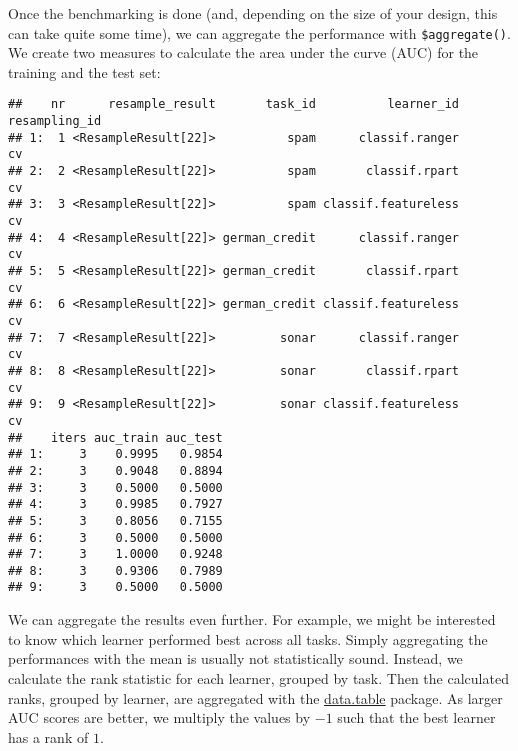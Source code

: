 \documentclass[
]{scrbook}
\newenvironment{Shaded}{\begin{snugshade}}{\end{snugshade}}
\newcommand{\AttributeTok}[1]{\textcolor[rgb]{0.77,0.63,0.00}{#1}}
\newcommand{\FunctionTok}[1]{\textcolor[rgb]{0.00,0.00,0.00}{#1}}
\newcommand{\NormalTok}[1]{#1}
\newcommand{\OtherTok}[1]{\textcolor[rgb]{0.56,0.35,0.01}{#1}}
\newcommand{\SpecialCharTok}[1]{\textcolor[rgb]{0.00,0.00,0.00}{#1}}
\newcommand{\StringTok}[1]{\textcolor[rgb]{0.31,0.60,0.02}{#1}}
\renewenvironment{Shaded} {\begin{snugshade}\small} {\end{snugshade}}
\begin{document}
Once the benchmarking is done (and, depending on the size of your design, this can take quite some time), we can aggregate the performance with \texttt{\$aggregate()}.
We create two measures to calculate the area under the curve (AUC) for the training and the test set:

\begin{Shaded}
\end{Shaded}

\begin{verbatim}
##    nr      resample_result       task_id          learner_id resampling_id
## 1:  1 <ResampleResult[22]>          spam      classif.ranger            cv
## 2:  2 <ResampleResult[22]>          spam       classif.rpart            cv
## 3:  3 <ResampleResult[22]>          spam classif.featureless            cv
## 4:  4 <ResampleResult[22]> german_credit      classif.ranger            cv
## 5:  5 <ResampleResult[22]> german_credit       classif.rpart            cv
## 6:  6 <ResampleResult[22]> german_credit classif.featureless            cv
## 7:  7 <ResampleResult[22]>         sonar      classif.ranger            cv
## 8:  8 <ResampleResult[22]>         sonar       classif.rpart            cv
## 9:  9 <ResampleResult[22]>         sonar classif.featureless            cv
##    iters auc_train auc_test
## 1:     3    0.9995   0.9854
## 2:     3    0.9048   0.8894
## 3:     3    0.5000   0.5000
## 4:     3    0.9985   0.7927
## 5:     3    0.8056   0.7155
## 6:     3    0.5000   0.5000
## 7:     3    1.0000   0.9248
## 8:     3    0.9306   0.7989
## 9:     3    0.5000   0.5000
\end{verbatim}

We can aggregate the results even further.
For example, we might be interested to know which learner performed best across all tasks.
Simply aggregating the performances with the mean is usually not statistically sound.
Instead, we calculate the rank statistic for each learner, grouped by task.
Then the calculated ranks, grouped by learner, are aggregated with the \href{https://cran.r-project.org/package=data.table}{data.table} package.
As larger AUC scores are better, we multiply the values by \(-1\) such that the best learner has a rank of \(1\).
\end{document}
